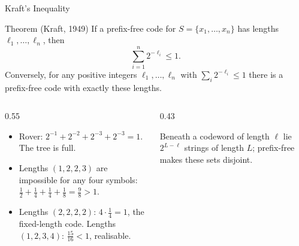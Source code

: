 \begin{frame}{Kraft's Inequality}
  \small
  \begin{block}{Theorem (Kraft, 1949)}
    If a prefix-free code for $S=\{x_1,\dots,x_n\}$ has lengths $\ell_1,\dots,\ell_n$, then
    \[
      \sum_{i=1}^n 2^{-\ell_i}\le1 .
    \]
    Conversely, for any positive integers $\ell_1,\dots,\ell_n$ with $\sum_i2^{-\ell_i}\le1$ there is a prefix-free code with exactly these lengths.
  \end{block}
  \begin{columns}[T]
    \begin{column}{0.55\textwidth}
      \begin{itemize}
        \item Rover: $2^{-1}+2^{-2}+2^{-3}+2^{-3}=1$. The tree is full.
        \item Lengths $(1,2,2,3)$ are impossible for any four symbols: $\tfrac12+\tfrac14+\tfrac14+\tfrac18=\tfrac98>1$.
        \item Lengths $(2,2,2,2)$: $4\cdot\tfrac14=1$, the fixed-length code. Lengths $(1,2,3,4)$: $\tfrac{15}{16}<1$, realisable.
      \end{itemize}
    \end{column}
    \begin{column}{0.43\textwidth}
      \centering
      \par\smallskip
      {\footnotesize Beneath a codeword of length $\ell$ lie $2^{L-\ell}$ strings of length $L$; prefix-free makes these sets disjoint.}
    \end{column}
  \end{columns}
\end{frame}

